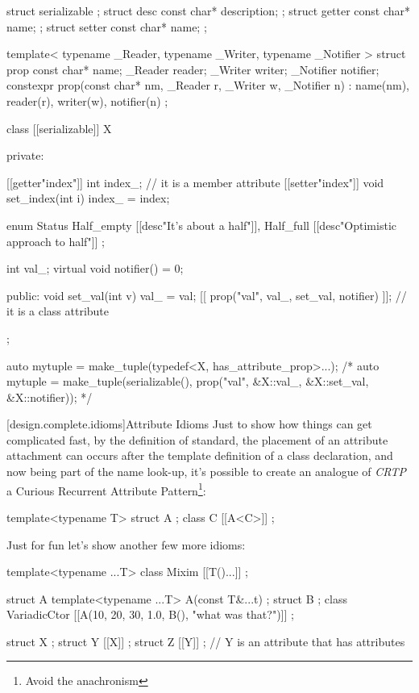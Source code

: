 \begin{codeblock}
struct serializable {};
struct desc { const char* description; };
struct getter { const char* name; };
struct setter { const char* name; };

template< typename _Reader, typename _Writer, typename _Notifier >
struct prop {
 const char* name;
 _Reader reader;
 _Writer writer;
 _Notifier notifier;
 constexpr prop(const char* nm, _Reader r, _Writer w, _Notifier n)
  : name(nm), reader(r), writer(w), notifier(n) {}
};

class [[serializable]] X {
private:

 [[getter{"index"}]] int index_; // it is a member attribute
 [[setter{"index"}]] void set_index(int i) { index_ = index; }

 enum Status {
  Half_empty [[desc{"It's about a half"}]],
  Half_full  [[desc{"Optimistic approach to half"}]]
 };

 int val_;
 virtual void notifier() = 0;

public:
 void set_val(int v) { val_ = val; }
 [[ prop("val", val_, set_val, notifier) ]]; // it is a class attribute
};

auto mytuple = make_tuple(typedef<X, has_attribute_prop>...);
/* auto mytuple =
     make_tuple(serializable(), 
                prop("val", &X::val_, &X::set_val, &X::notifier));
*/
\end{codeblock}
[design.complete.idioms]{Attribute Idioms}
Just to show how things can get complicated fast, by the definition of standard, the placement of an attribute attachment can occurs after the template definition of a class declaration, and now being part of the name look-up, it's possible to create an analogue of \emph{CRTP} a Curious Recurrent Attribute Pattern\footnote{Avoid the anachronism}:
\begin{codeblock}
template<typename T> struct A {};
class C [[A<C>]] {};
\end{codeblock}
Just for fun let's show another few more idioms:
\begin{codeblock}
template<typename ...T> class Mixim [[T()...]] {};

struct A { template<typename ...T> A(const T&...t) {} };
struct B {};
class VariadicCtor [[A(10, 20, 30, 1.0, B(), "what was that?")]] {};

struct X {};
struct Y [[X]] {};
struct Z [[Y]] {}; // Y is an attribute that has attributes
\end{codeblock}